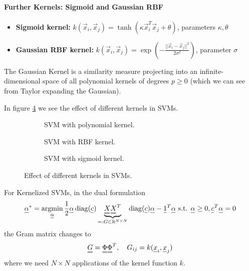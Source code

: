 \paragraph*{Further Kernels: Sigmoid and Gaussian RBF}
\begin{itemize}
    \item \textbf{Sigmoid kernel:} $k(\vec{x}_i, \vec{x}_j) = \tanh(\kappa \vec{x}_i^T \vec{x}_j + \theta)$, parameters $\kappa, \theta$
    \item \textbf{Gaussian RBF kernel:} $k(\vec{x}_i, \vec{x}_j) = \exp\left(-\frac{||\vec{x}_i - \vec{x}_j||^2}{2\sigma^2}\right)$, parameter $\sigma$
\end{itemize}
The Gaussian Kernel is a similarity measure projecting 
into an infinite-dimensional space of all polynomial kernels 
of degrees $p \geq 0$ (which we can see from Taylor 
expanding the Gaussian).

In figure \ref{fig:kernel_trick} we see the effect of different kernels in SVMs.

\begin{figure}

    \centering
    \begin{subfigure}{0.45\textwidth}
      \centering
      
      \caption{SVM with polynomial kernel.}
      \label{fig:poly_kernel}
    \end{subfigure}%



    \begin{subfigure}{0.45\textwidth}
      \centering
      
      \caption{SVM with RBF kernel.}
      \label{fig:rbf_kernel}
    \end{subfigure}



    \begin{subfigure}{0.45\textwidth}
        \centering
        
        \caption{SVM with sigmoid kernel.}
        \label{fig:sigmoid_kernel}
      \end{subfigure}

    \caption{Effect of different kernels in SVMs.}
    \label{fig:kernel_trick}

\end{figure}

For Kernelized SVMs, in the dual formulation
\begin{equation}
    \vec{\alpha}^* = \argmin_{\vec{\alpha}} \frac{1}{2} \vec{\alpha} \operatorname{diag}(\vec{c}) \underbrace{\mat{X} \mat{X}^T}_{=:G \in \mathbb{R}^{N\times N}} \operatorname{diag}(\vec{c}) \vec{\alpha} - \vec{1}^T \vec{\alpha} \text{ s.t. } \vec{\alpha} \geq 0, \vec{c}^T \vec{\alpha} = 0
\end{equation}
the Gram matrix changes to
\begin{equation}
    \mat{G} = \mat{\Phi} \mat{\Phi}^T, \quad G_{ij} = k(\vec{x}_i, \vec{x}_j)
\end{equation}
where we need $N\times N$ applications of the kernel function $k$.

